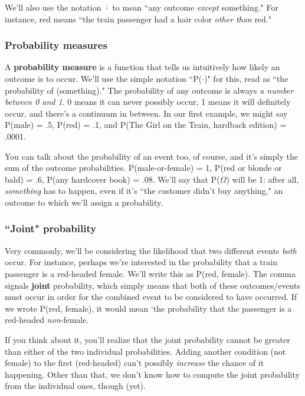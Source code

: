 \documentclass[12pt]{article}
\begin{document}
We'll also use the notation $\overline{\cdot}$ to mean ``any outcome
\textit{except} something." For instance, $\overline{\textrm{red}}$ means
``the train passenger had a hair color \textit{other than} red."

\subsubsection{Probability measures}

A \textbf{probability measure} is a function that tells us intuitively how
likely an outcome is to occur. We'll use the simple notation ``P($\cdot$)" for
this, read as ``the probability of (something)." The probability of any
outcome is always \textit{a number between 0 and 1}. 0 means it can never
possibly occur, 1 means it will definitely occur, and there's a continuum in
between. In our first example, we might say P(male) = .5, P(red) = .1, and
P(The Girl on the Train, hardback edition) = .0001.

You can talk about the probability of an event too, of course, and it's simply
the sum of the outcome probabilities. P(male-or-female) = 1, P(red or blonde
or bald) = .6, P(any hardcover book) = .08. We'll say that P($\Omega$) will be
1: after all, \textit{something} has to happen, even if it's ``the customer
didn't buy anything," an outcome to which we'll assign a probability.

\subsubsection{``Joint" probability}

Very commonly, we'll be considering the likelihood that two different events
\textit{both} occur. For instance, perhaps we're interested in the probability
that a train passenger is a red-headed female. We'll write this as P(red,
female). The comma signals \textbf{joint} probability, which simply means that
both of these outcomes/events must occur in order for the combined event to be
considered to have occurred. If we wrote P(red, $\overline{\textrm{female}}$),
it would mean `the probability that the passenger is a red-headed
\textit{non}-female.

If you think about it, you'll realize that the joint probability cannot be
greater than either of the two individual probabilities. Adding another
condition (not female) to the first (red-headed) can't possibly
\textit{increase} the chance of it happening. Other than that, we don't know
how to compute the joint probability from the individual ones, though (yet).
\end{document}
